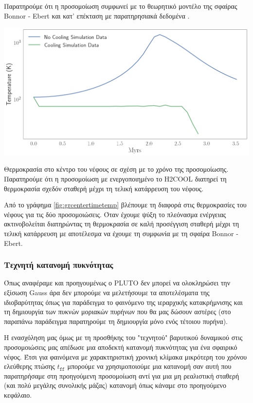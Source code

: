  Παρατηρούμε ότι η προσομοίωση συμφωνεί με το θεωρητικό μοντέλο της σφαίρας Bonnor - Ebert και κατ' επέκταση με παρατηρησιακά δεδομένα .  



\begin{marginfigure}
	\centering
	\includegraphics[width=1\linewidth]{DataImages/GRcenterTimeTemp}
	\caption{Θερμοκρασία στο κέντρο του νέφους σε σχέση με το χρόνο της προσομοίωσης. Παρατηρούμε ότι η προσομοίωση με ενεργοποιημένο το H2COOL διατηρεί τη θερμοκρασία σχεδόν σταθερή μέχρι τη τελική κατάρρευση του νέφους.}
	\label{fig:grcentertimetemp}
\end{marginfigure}

Από το γράφημα \ref{fig:grcentertimetemp} βλέπουμε τη διαφορά στις θερμοκρασίες του νέφους για τις δύο προσομοιώσεις. Όταν έχουμε ψύξη το πλεόνασμα ενέργειας ακτινοβολείται διατηρώντας τη θερμοκρασία σε καλή προσέγγιση σταθερή μέχρι τη τελική κατάρρευση με αποτέλεσμα να έχουμε τη συμφωνία με τη σφαίρα Bonnor - Ebert. 


\subsubsection{Τεχνητή κατανομή πυκνότητας}
Όπως αναφέραμε και προηγουμένως ο PLUTO δεν μπορεί να ολοκληρώσει την εξίσωση Gauss άρα δεν μπορούμε να μελετήσουμε τα αποτελέσματα της ιδιοβαρύτητας όπως για παράδειγμα το φαινόμενο της ιεραρχικής κατακρήμνισης και τη δημιουργία των πυκνών μοριακών πυρήνων που θα μας δώσουν αστέρες (στο παραπάνω παράδειγμα παρατηρούμε τη δημιουργία μόνο ενός τέτοιου πυρήνα). 

Η ενασχόληση μας όμως με τη προσθήκης του "τεχνητού" βαρυτικού δυναμικού στις προσομοιώσεις μας απέδωσε μια αποδεκτή κατανομή πυκνότητας για ένα σφαιρικό νέφος. Έτσι για φαινόμενα με χαρακτηριστική χρονική κλίμακα μικρότερη του χρόνου ελεύθερης πτώσης $t_\mathtt{ff}$ μπορούμε να χρησιμοποιούμε μια κατανομή σαν αυτή που παρατηρήσαμε στη προηγούμενη προσομοίωση αντί για μια μη ρεαλιστική σταθερή (και πολύ μεγάλης συνολικής μάζας) κατανομή όπως κάναμε στο προηγούμενο κεφάλαιο.


